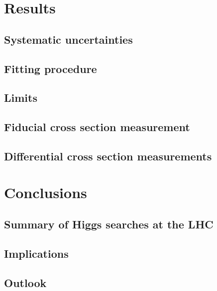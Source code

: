\documentclass[hyper,linkcolor=blue]{mythesis}
\begin{document}
\begin{mainmatter}
  \chapter{Results}
    \label{chap:results}
    
    \section{Systematic uncertainties}
      \label{sec:systematics}
      
    \section{Fitting procedure}
    \section{Limits}
    \section{Fiducial cross section measurement}
      \label{sec:fiducial}
      
    \section{Differential cross section measurements}
      \label{sec:unfolding}
      

  \chapter{Conclusions}
    \label{chap:conclusions}
    
    \section{Summary of Higgs searches at the LHC}
      \label{sec:searches}
      
    \section{Implications}
      \label{sec:implications}
      
    \section{Outlook}
      \label{sec:outlook}
      
\end{mainmatter}

\begin{appendices}

\end{appendices}

\begin{backmatter}
  
  
\end{backmatter}
\end{document}
